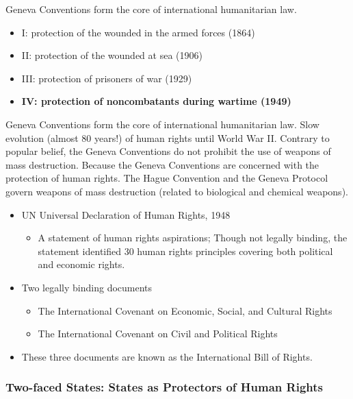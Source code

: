 \documentclass[
]{book}
\providecommand{\tightlist}{%
  \setlength{\itemsep}{0pt}\setlength{\parskip}{0pt}}
\begin{document}
Geneva Conventions form the core of international humanitarian law.

\begin{itemize}
\item
  I: protection of the wounded in the armed forces (1864)
\item
  II: protection of the wounded at sea (1906)
\item
  III: protection of prisoners of war (1929)
\item
  \textbf{IV: protection of noncombatants during wartime (1949)}
\end{itemize}

Geneva Conventions form the core of international humanitarian law. Slow evolution (almost 80 years!) of human rights until World War II. Contrary to popular belief, the Geneva Conventions do not prohibit the use of weapons of mass destruction. Because the Geneva Conventions are concerned with the protection of human rights. The Hague Convention and the Geneva Protocol govern weapons of mass destruction (related to biological and chemical weapons).

\begin{itemize}
\item
  UN Universal Declaration of Human Rights, 1948

  \begin{itemize}
  \tightlist
  \item
    A statement of human rights aspirations; Though not legally binding, the statement identified 30 human rights principles covering both political and economic rights.
  \end{itemize}
\item
  Two legally binding documents

  \begin{itemize}
  \item
    The International Covenant on Economic, Social, and Cultural Rights
  \item
    The International Covenant on Civil and Political Rights
  \end{itemize}
\item
  These three documents are known as the International Bill of Rights.
\end{itemize}

\hypertarget{two-faced-states-states-as-protectors-of-human-rights}{%
\subsubsection{Two-faced States: States as Protectors of Human Rights}\label{two-faced-states-states-as-protectors-of-human-rights}}
\end{document}
